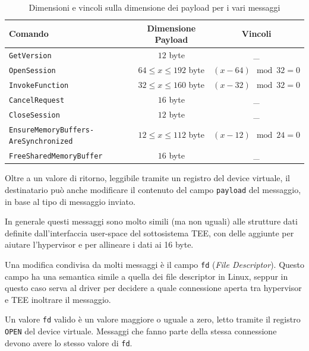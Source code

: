 \documentclass[12pt,italian]{report}
\begin{document}
\begin{table}
    \centering
    \begin{tabular}{|m{5.3cm}|c|c|}
        \hline
        \textbf{Comando}    & \textbf{Dimensione Payload} & \textbf{Vincoli}    \\
        \hline
        \texttt{GetVersion}                             & $12$ byte                 & \_                     \\
        \texttt{OpenSession}                            & $64 \leq x \leq 192$ byte & $(x - 64) \mod 32 = 0$ \\
        \texttt{InvokeFunction}                         & $32 \leq x \leq 160$ byte & $(x - 32) \mod 32 = 0$ \\
        \texttt{CancelRequest}                          & $16$ byte                 & \_                     \\
        \texttt{CloseSession}                           & $12$ byte                 & \_                     \\
        \texttt{EnsureMemoryBuffers-AreSynchronized}    & $12 \leq x \leq 112$ byte & $(x - 12) \mod 24 = 0$ \\
        \texttt{FreeSharedMemoryBuffer}                 & $16$ byte                 & \_                     \\
        \hline
    \end{tabular}
    \caption{
        Dimensioni e vincoli sulla dimensione dei payload per i vari messaggi
    }
    \label{tab:dimensioni-valide-payload}
\end{table}

Oltre a un valore di ritorno, leggibile tramite un registro del device
virtuale, il destinatario può anche modificare il contenuto del campo
\texttt{payload} del messaggio, in base al tipo di messaggio inviato.

In generale questi messaggi sono molto simili (ma non uguali) alle strutture
dati definite dall'interfaccia user-space del sottosistema TEE, con delle
aggiunte per aiutare l'hypervisor e per allineare i dati ai 16 byte.

Una modifica condivisa da molti messaggi è il campo \texttt{fd}
(\textit{File Descriptor}). Questo campo ha una semantica simile a quella
dei file descriptor in Linux, seppur in questo caso serva al driver per
decidere a quale connessione aperta tra hypervisor e TEE inoltrare il messaggio.

Un valore \texttt{fd} valido è un valore maggiore o uguale a zero, letto
tramite il registro \texttt{OPEN} del device virtuale.
Messaggi che fanno parte della stessa connessione devono avere
lo stesso valore di \texttt{fd}.
\end{document}
